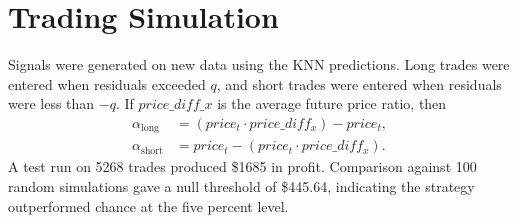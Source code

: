 \documentclass{article}
\begin{document}
\section{Trading Simulation}
Signals were generated on new data using the KNN predictions. Long trades were entered when residuals exceeded $q$, and short trades were entered when residuals were less than $-q$. If $price\_diff\_x$ is the average future price ratio, then
\begin{align*}
\alpha_{\text{long}} &= (price_t \cdot price\_diff_x) - price_t,\\
\alpha_{\text{short}} &= price_t - (price_t \cdot price\_diff_x).
\end{align*}
A test run on 5268 trades produced \$1685 in profit. Comparison against 100 random simulations gave a null threshold of \$445.64, indicating the strategy outperformed chance at the five percent level.
\end{document}
